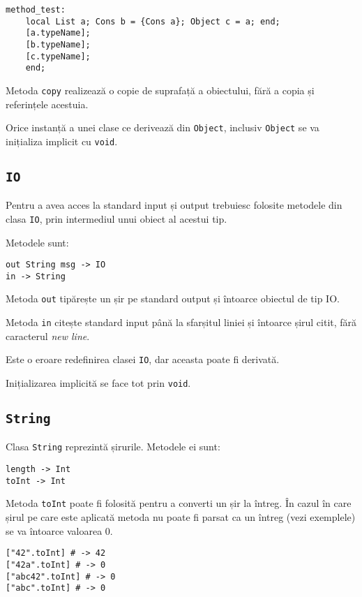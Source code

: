 \documentclass[12pt]{article}
\begin{document}
\begin{verbatim}
method_test:
    local List a; Cons b = {Cons a}; Object c = a; end;
    [a.typeName];
    [b.typeName];
    [c.typeName];
    end;
\end{verbatim}

Metoda \texttt{copy} realizează o copie de suprafață a obiectului, fără a copia și referințele acestuia.

Orice instanță a unei clase ce derivează din \texttt{Object}, inclusiv \texttt{Object} se va inițializa implicit cu \texttt{void}.

\subsection{\texttt{IO}}

Pentru a avea acces la standard input și output trebuiesc folosite metodele din clasa \texttt{IO}, prin intermediul unui obiect al acestui tip.

Metodele sunt:

\begin{verbatim}
out String msg -> IO
in -> String
\end{verbatim}

Metoda \texttt{out} tipărește un șir pe standard output și întoarce obiectul de tip IO.

Metoda \texttt{in} citește standard input până la sfarșitul liniei și întoarce șirul citit, fără caracterul \textit{new line}.

Este o eroare redefinirea clasei \texttt{IO}, dar aceasta poate fi derivată.

Inițializarea implicită se face tot prin \texttt{void}.

\subsection{\texttt{String}}

Clasa \texttt{String} reprezintă șirurile. Metodele ei sunt:

\begin{verbatim}
length -> Int
toInt -> Int
\end{verbatim}

Metoda \texttt{toInt} poate fi folosită pentru a converti un șir la întreg. În cazul în care șirul pe care este aplicată metoda nu poate fi parsat ca un întreg (vezi exemplele) se va întoarce valoarea 0.

\begin{verbatim}
["42".toInt] # -> 42
["42a".toInt] # -> 0
["abc42".toInt] # -> 0
["abc".toInt] # -> 0
\end{verbatim}
\end{document}
